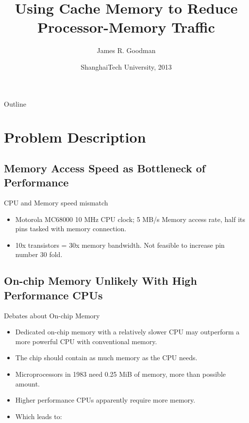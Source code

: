 \documentclass{beamer}
\title{Using Cache Memory to Reduce Processor-Memory Traffic}
\author{James R. Goodman\inst{1}}
\institute[Universities of Somewhere and Elsewhere] %
{
  \inst{1}%
  Department of Computer Sciences\\
  University of Wisconsin-Madison}
\date{ShanghaiTech University, 2013}
\begin{document}
\begin{frame}
  \titlepage
\end{frame}

\begin{frame}{Outline}
  \tableofcontents
\end{frame}

\section{Problem Description}

\subsection{Memory Access Speed as Bottleneck of Performance}

\begin{frame}{CPU and Memory speed mismatch}
  \begin{itemize}
  \item {
  	\begin{Example}
    Motorola MC68000
    10 MHz CPU clock; 5 MB/s Memory access rate, half its pins tasked with memory connection.
    \pause
    \end{Example}
  }
  \item {
    10x transistors = 30x memory bandwidth. Not feasible to increase pin number 30 fold.
  }
  \end{itemize}
\end{frame}

\subsection{On-chip Memory Unlikely With High Performance CPUs}

\begin{frame}{Debates about On-chip Memory}
  \begin{itemize}
  \item {
    Dedicated on-chip memory with a relatively slower CPU may outperform a more powerful CPU with conventional memory.
    \pause %
  }
  \item {   
    The chip should contain as much memory as the CPU needs.
  }
  \item<3-> {
    Microprocessors in 1983 need 0.25 MiB of memory, more than possible amount.
  }
  \item<4-> {
    Higher performance CPUs apparently require more memory.
  }
  \item<5-> {
    Which leads to: 
  }
  \end{itemize}
\end{frame}
\end{document}
